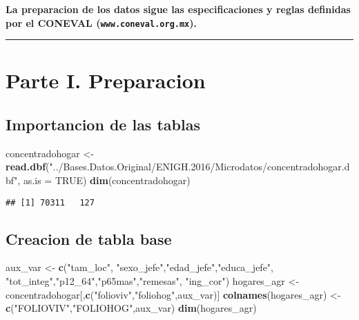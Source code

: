 \documentclass[11pt,]{article}
\newenvironment{Shaded}{\begin{snugshade}}{\end{snugshade}}
\newcommand{\KeywordTok}[1]{\textcolor[rgb]{0.13,0.29,0.53}{\textbf{#1}}}
\newcommand{\DataTypeTok}[1]{\textcolor[rgb]{0.13,0.29,0.53}{#1}}
\newcommand{\StringTok}[1]{\textcolor[rgb]{0.31,0.60,0.02}{#1}}
\newcommand{\OtherTok}[1]{\textcolor[rgb]{0.56,0.35,0.01}{#1}}
\newcommand{\NormalTok}[1]{#1}
\begin{document}
\textbf{La preparacion de los datos sigue las especificaciones y reglas
definidas por el CONEVAL (\texttt{www.coneval.org.mx}).}

\begin{center}\rule{0.5\linewidth}{\linethickness}\end{center}

\section{Parte I. Preparacion}\label{parte-i.-preparacion}

\subsection{Importancion de las
tablas}\label{importancion-de-las-tablas}

\begin{Shaded}
\begin{Highlighting}[]
\NormalTok{concentradohogar <-}\StringTok{ }\KeywordTok{read.dbf}\NormalTok{(}\StringTok{"../Bases.Datos.Original/ENIGH.2016/Microdatos/concentradohogar.dbf"}\NormalTok{, }
                       \DataTypeTok{as.is =} \OtherTok{TRUE}\NormalTok{)}
\KeywordTok{dim}\NormalTok{(concentradohogar)}
\end{Highlighting}
\end{Shaded}

\begin{verbatim}
## [1] 70311   127
\end{verbatim}

\subsection{Creacion de tabla base}\label{creacion-de-tabla-base}

\begin{Shaded}
\begin{Highlighting}[]
\NormalTok{aux_var <-}\StringTok{ }\KeywordTok{c}\NormalTok{(}\StringTok{"tam_loc"}\NormalTok{,}
             \StringTok{"sexo_jefe"}\NormalTok{,}\StringTok{"edad_jefe"}\NormalTok{,}\StringTok{"educa_jefe"}\NormalTok{,}
             \StringTok{"tot_integ"}\NormalTok{,}\StringTok{"p12_64"}\NormalTok{,}\StringTok{"p65mas"}\NormalTok{,}\StringTok{"remesas"}\NormalTok{,}
             \StringTok{"ing_cor"}\NormalTok{)}
\NormalTok{hogares_agr <-}\StringTok{ }\NormalTok{concentradohogar[,}\KeywordTok{c}\NormalTok{(}\StringTok{"folioviv"}\NormalTok{,}\StringTok{"foliohog"}\NormalTok{,aux_var)]}
\KeywordTok{colnames}\NormalTok{(hogares_agr) <-}\StringTok{ }\KeywordTok{c}\NormalTok{(}\StringTok{"FOLIOVIV"}\NormalTok{,}\StringTok{"FOLIOHOG"}\NormalTok{,aux_var)}
\KeywordTok{dim}\NormalTok{(hogares_agr)}
\end{Highlighting}
\end{Shaded}
\end{document}

